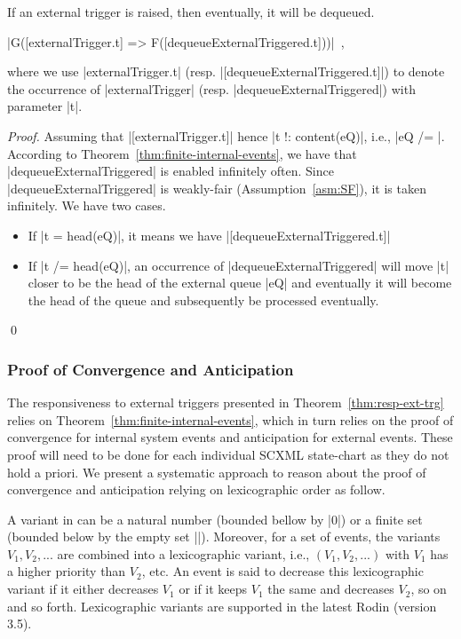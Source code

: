 \begin{theorem}
  \label{thm:resp-ext-trg}
  If an external trigger is raised, then eventually, it will be dequeued.
  \begin{center}
    |G([externalTrigger.t] => F([dequeueExternalTriggered.t]))|~,
  \end{center}
  where we use |externalTrigger.t|
  (resp. |[dequeueExternalTriggered.t]|) to denote the occurrence of
  |externalTrigger| (resp. |dequeueExternalTriggered|) with parameter |t|.
\end{theorem}
\begin{proof}
  Assuming that |[externalTrigger.t]| hence |t !: content(eQ)|, i.e.,
  |eQ /= {}|.  According to Theorem~\ref{thm:finite-internal-events},
  we have that |dequeueExternalTriggered| is enabled infinitely often.
  Since |dequeueExternalTriggered| is weakly-fair
  (Assumption~\ref{asm:SF}), it is taken infinitely. We have two
  cases.
  \begin{itemize}
  \item If |t = head(eQ)|, it means we have
    |[dequeueExternalTriggered.t]|
    
  \item If |t /= head(eQ)|, an occurrence of |dequeueExternalTriggered|
    will move |t| closer to be the head of the external queue |eQ| and
    eventually it will become the head of the queue and subsequently
    be processed eventually.
  \end{itemize}
  \qed
\end{proof}

\subsubsection{Proof of Convergence and Anticipation}
\label{sec:proof-convergence}
The responsiveness to external triggers presented in
Theorem~\ref{thm:resp-ext-trg} relies on
Theorem~\ref{thm:finite-internal-events}, which in turn relies on the
proof of convergence for internal system events and anticipation for
external events.  These proof will need to be done for each individual
SCXML state-chart as they do not hold a priori.  We present a
systematic approach to reason about the proof of convergence and
anticipation relying on lexicographic order as follow.

A variant in \EventB can be a natural number (bounded bellow by |0|)
or a finite set (bounded below by the empty set |{}|).  Moreover, for
a set of events, the variants $V_1, V_2, ...$ are combined into a
lexicographic variant, i.e., $(V_1, V_2, ...)$ with $V_1$ has a higher
priority than $V_2$, etc. An event is said to decrease this
lexicographic variant if it either decreases $V_1$ or if it keeps
$V_1$ the same and decreases $V_2$, so on and so forth.  Lexicographic
variants are supported in the latest Rodin (version 3.5).

